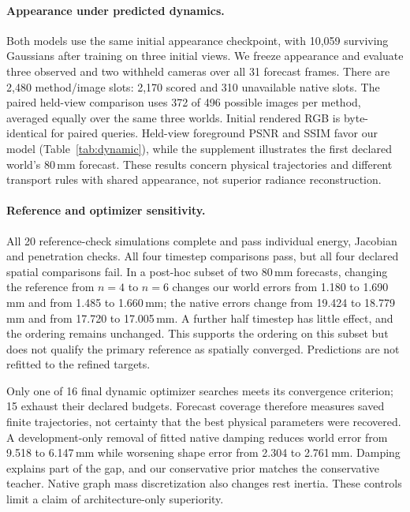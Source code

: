 \documentclass[10pt,twocolumn,letterpaper]{article}
\begin{document}
\paragraph{Appearance under predicted dynamics.}
Both models use the same initial appearance checkpoint, with 10,059 surviving Gaussians after training on three initial views. We freeze appearance and evaluate three observed and two withheld cameras over all 31 forecast frames. There are 2,480 method/image slots: 2,170 scored and 310 unavailable native slots. The paired held-view comparison uses 372 of 496 possible images per method, averaged equally over the same three worlds. Initial rendered RGB is byte-identical for paired queries. Held-view foreground PSNR and SSIM favor our model (Table~\ref{tab:dynamic}), while the supplement illustrates the first declared world's 80\,mm forecast. These results concern physical trajectories and different transport rules with shared appearance, not superior radiance reconstruction.



\paragraph{Reference and optimizer sensitivity.}
All 20 reference-check simulations complete and pass individual energy, Jacobian and penetration checks. All four timestep comparisons pass, but all four declared spatial comparisons fail. In a post-hoc subset of two 80\,mm forecasts, changing the reference from $n=4$ to $n=6$ changes our world errors from 1.180 to 1.690\,mm and from 1.485 to 1.660\,mm; the native errors change from 19.424 to 18.779\,mm and from 17.720 to 17.005\,mm. A further half timestep has little effect, and the ordering remains unchanged. This supports the ordering on this subset but does not qualify the primary reference as spatially converged. Predictions are not refitted to the refined targets.

Only one of 16 final dynamic optimizer searches meets its convergence criterion; 15 exhaust their declared budgets. Forecast coverage therefore measures saved finite trajectories, not certainty that the best physical parameters were recovered. A development-only removal of fitted native damping reduces world error from 9.518 to 6.147\,mm while worsening shape error from 2.304 to 2.761\,mm. Damping explains part of the gap, and our conservative prior matches the conservative teacher. Native graph mass discretization also changes rest inertia. These controls limit a claim of architecture-only superiority.
\end{document}

